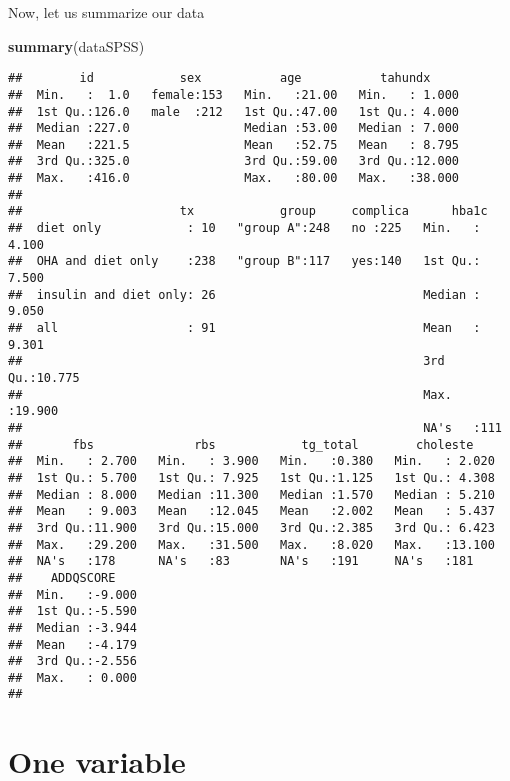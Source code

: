 \documentclass[]{book}
\newenvironment{Shaded}{\begin{snugshade}}{\end{snugshade}}
\newcommand{\KeywordTok}[1]{\textcolor[rgb]{0.13,0.29,0.53}{\textbf{{#1}}}}
\newcommand{\NormalTok}[1]{{#1}}
\theoremstyle{definition}
\theoremstyle{definition}
\theoremstyle{remark}
\begin{document}
Now, let us summarize our data

\begin{Shaded}
\begin{Highlighting}[]
\KeywordTok{summary}\NormalTok{(dataSPSS)}
\end{Highlighting}
\end{Shaded}

\begin{verbatim}
##        id            sex           age           tahundx      
##  Min.   :  1.0   female:153   Min.   :21.00   Min.   : 1.000  
##  1st Qu.:126.0   male  :212   1st Qu.:47.00   1st Qu.: 4.000  
##  Median :227.0                Median :53.00   Median : 7.000  
##  Mean   :221.5                Mean   :52.75   Mean   : 8.795  
##  3rd Qu.:325.0                3rd Qu.:59.00   3rd Qu.:12.000  
##  Max.   :416.0                Max.   :80.00   Max.   :38.000  
##                                                               
##                      tx            group     complica      hba1c       
##  diet only            : 10   "group A":248   no :225   Min.   : 4.100  
##  OHA and diet only    :238   "group B":117   yes:140   1st Qu.: 7.500  
##  insulin and diet only: 26                             Median : 9.050  
##  all                  : 91                             Mean   : 9.301  
##                                                        3rd Qu.:10.775  
##                                                        Max.   :19.900  
##                                                        NA's   :111     
##       fbs              rbs            tg_total        choleste     
##  Min.   : 2.700   Min.   : 3.900   Min.   :0.380   Min.   : 2.020  
##  1st Qu.: 5.700   1st Qu.: 7.925   1st Qu.:1.125   1st Qu.: 4.308  
##  Median : 8.000   Median :11.300   Median :1.570   Median : 5.210  
##  Mean   : 9.003   Mean   :12.045   Mean   :2.002   Mean   : 5.437  
##  3rd Qu.:11.900   3rd Qu.:15.000   3rd Qu.:2.385   3rd Qu.: 6.423  
##  Max.   :29.200   Max.   :31.500   Max.   :8.020   Max.   :13.100  
##  NA's   :178      NA's   :83       NA's   :191     NA's   :181     
##    ADDQSCORE     
##  Min.   :-9.000  
##  1st Qu.:-5.590  
##  Median :-3.944  
##  Mean   :-4.179  
##  3rd Qu.:-2.556  
##  Max.   : 0.000  
## 
\end{verbatim}

\section{One variable}\label{one-variable}
\end{document}
